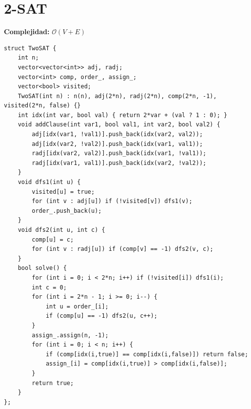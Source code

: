 \documentclass[10pt,twocolumn,letterpaper]{report}
\begin{document}
\section{2-SAT}
\textbf{Complejidad:} $\mathcal{O}(V + E)$
\begin{lstlisting}
struct TwoSAT {
    int n;
    vector<vector<int>> adj, radj;
    vector<int> comp, order_, assign_;
    vector<bool> visited;
    TwoSAT(int n) : n(n), adj(2*n), radj(2*n), comp(2*n, -1), visited(2*n, false) {}
    int idx(int var, bool val) { return 2*var + (val ? 1 : 0); }
    void addClause(int var1, bool val1, int var2, bool val2) {
        adj[idx(var1, !val1)].push_back(idx(var2, val2));
        adj[idx(var2, !val2)].push_back(idx(var1, val1));
        radj[idx(var2, val2)].push_back(idx(var1, !val1));
        radj[idx(var1, val1)].push_back(idx(var2, !val2));
    }
    void dfs1(int u) {
        visited[u] = true;
        for (int v : adj[u]) if (!visited[v]) dfs1(v);
        order_.push_back(u);
    }
    void dfs2(int u, int c) {
        comp[u] = c;
        for (int v : radj[u]) if (comp[v] == -1) dfs2(v, c);
    }
    bool solve() {
        for (int i = 0; i < 2*n; i++) if (!visited[i]) dfs1(i);
        int c = 0;
        for (int i = 2*n - 1; i >= 0; i--) {
            int u = order_[i];
            if (comp[u] == -1) dfs2(u, c++);
        }
        assign_.assign(n, -1);
        for (int i = 0; i < n; i++) {
            if (comp[idx(i,true)] == comp[idx(i,false)]) return false;
            assign_[i] = comp[idx(i,true)] > comp[idx(i,false)];
        }
        return true;
    }
};
\end{lstlisting}

\end{document}
